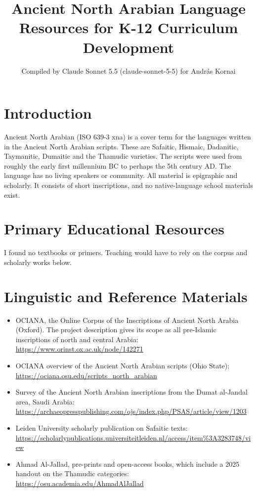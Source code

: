 \documentclass[12pt]{article}
\title{Ancient North Arabian Language Resources for K-12 Curriculum Development}
\author{Compiled by Claude Sonnet 5.5 (claude-sonnet-5-5) for Andr\'as Kornai}
\date{}
\begin{document}
\maketitle

\section{Introduction}
Ancient North Arabian (ISO 639-3 xna) is a cover term for the languages written in the Ancient North Arabian scripts. These are Safaitic, Hismaic, Dadanitic, Taymanitic, Dumaitic and the Thamudic varieties. The scripts were used from roughly the early first millennium BC to perhaps the 5th century AD. The language has no living speakers or community. All material is epigraphic and scholarly. It consists of short inscriptions, and no native-language school materials exist.

\section{Primary Educational Resources}
I found no textbooks or primers. Teaching would have to rely on the corpus and scholarly works below.

\section{Linguistic and Reference Materials}
\begin{itemize}
\item OCIANA, the Online Corpus of the Inscriptions of Ancient North Arabia (Oxford). The project description gives its scope as all pre-Islamic inscriptions of north and central Arabia: \url{https://www.orinst.ox.ac.uk/node/142271}
\item OCIANA overview of the Ancient North Arabian scripts (Ohio State): \url{https://ociana.osu.edu/scripts_north_arabian}
\item Survey of the Ancient North Arabian inscriptions from the Dumat al-Jandal area, Saudi Arabia: \url{https://archaeopresspublishing.com/ojs/index.php/PSAS/article/view/1203}
\item Leiden University scholarly publication on Safaitic texts: \url{https://scholarlypublications.universiteitleiden.nl/access/item%3A3283748/view}
\item Ahmad Al-Jallad, pre-prints and open-access books, which include a 2025 handout on the Thamudic categories: \url{https://osu.academia.edu/AhmadAlJallad}
\end{itemize}
\end{document}
